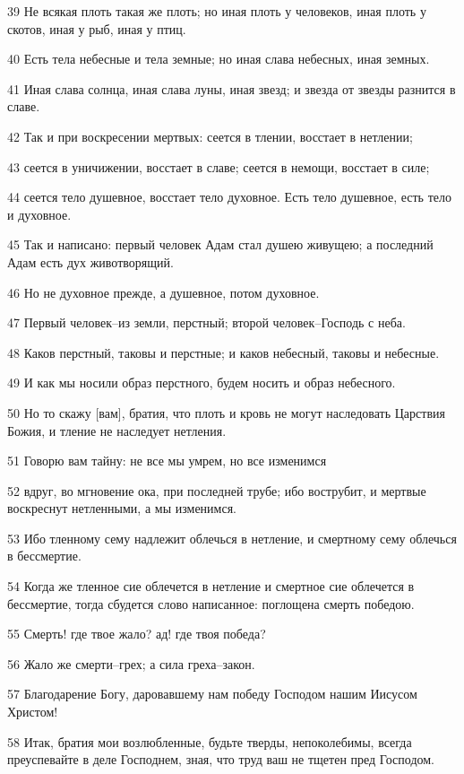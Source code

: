 \par 39 Не всякая плоть такая же плоть; но иная плоть у человеков, иная плоть у скотов, иная у рыб, иная у птиц.
\par 40 Есть тела небесные и тела земные; но иная слава небесных, иная земных.
\par 41 Иная слава солнца, иная слава луны, иная звезд; и звезда от звезды разнится в славе.
\par 42 Так и при воскресении мертвых: сеется в тлении, восстает в нетлении;
\par 43 сеется в уничижении, восстает в славе; сеется в немощи, восстает в силе;
\par 44 сеется тело душевное, восстает тело духовное. Есть тело душевное, есть тело и духовное.
\par 45 Так и написано: первый человек Адам стал душею живущею; а последний Адам есть дух животворящий.
\par 46 Но не духовное прежде, а душевное, потом духовное.
\par 47 Первый человек--из земли, перстный; второй человек--Господь с неба.
\par 48 Каков перстный, таковы и перстные; и каков небесный, таковы и небесные.
\par 49 И как мы носили образ перстного, будем носить и образ небесного.
\par 50 Но то скажу [вам], братия, что плоть и кровь не могут наследовать Царствия Божия, и тление не наследует нетления.
\par 51 Говорю вам тайну: не все мы умрем, но все изменимся
\par 52 вдруг, во мгновение ока, при последней трубе; ибо вострубит, и мертвые воскреснут нетленными, а мы изменимся.
\par 53 Ибо тленному сему надлежит облечься в нетление, и смертному сему облечься в бессмертие.
\par 54 Когда же тленное сие облечется в нетление и смертное сие облечется в бессмертие, тогда сбудется слово написанное: поглощена смерть победою.
\par 55 Смерть! где твое жало? ад! где твоя победа?
\par 56 Жало же смерти--грех; а сила греха--закон.
\par 57 Благодарение Богу, даровавшему нам победу Господом нашим Иисусом Христом!
\par 58 Итак, братия мои возлюбленные, будьте тверды, непоколебимы, всегда преуспевайте в деле Господнем, зная, что труд ваш не тщетен пред Господом.

